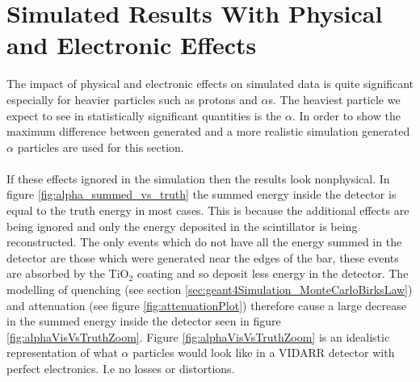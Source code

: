 \section{Simulated Results With Physical and Electronic Effects}\label{sec:geant4Simulation_resultsPhysicalElectronics}
The impact of physical and electronic effects on simulated data is quite significant especially for heavier particles such as protons and $\alpha$s. The heaviest particle we expect to see in statistically significant quantities is the $\alpha$. In order to show the maximum difference between generated and a more realistic simulation generated $\alpha$ particles are used for this section. 
\\\\If these effects ignored in the simulation then the results look nonphysical. In figure \ref{fig:alpha_summed_vs_truth} the summed energy inside the detector is equal to the truth energy in most cases. This is because the additional effects are being ignored and only the energy deposited in the scintillator is being reconstructed. The only events which do not have all the energy summed in the detector are those which were generated near the edges of the bar, these events are absorbed by the TiO$_2$ coating and so deposit less energy in the detector. The modelling of quenching (see section \ref{sec:geant4Simulation_MonteCarloBirksLaw}) and attenuation (see figure \ref{fig:attenuationPlot}) therefore cause a large decrease in the summed energy inside the detector seen in figure \ref{fig:alphaVisVsTruthZoom}. Figure \ref{fig:alphaVisVsTruthZoom} is an idealistic representation of what $\alpha$ particles would look like in a VIDARR detector with perfect electronics. I.e no losses or distortions.


